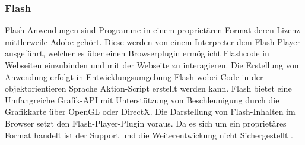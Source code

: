 \subsubsection{Flash}
\label{sec:Flash}
Flash Anwendungen sind Programme in einem proprietären Format deren Lizenz mittlerweile Adobe gehört.
Diese werden von einem Interpreter dem Flash-Player ausgeführt, welcher es über einen Browserplugin ermöglicht Flashcode in Webseiten einzubinden und mit der Webseite zu interagieren.
%
Die Erstellung von Anwendung erfolgt in Entwicklungsumgebung Flash wobei Code in der objektorientieren Sprache Aktion-Script erstellt werden kann.
Flash bietet eine Umfangreiche Grafik-API mit Unterstützung von Beschleunigung durch die Grafikkarte über OpenGL oder DirectX.
%
Die Darstellung von Flash-Inhalten im Browser setzt den Flash-Player-Plugin voraus.
Da es sich um ein proprietäres Format handelt ist der Support und die Weiterentwickung nicht Sichergestellt \cite{flash-14}.
